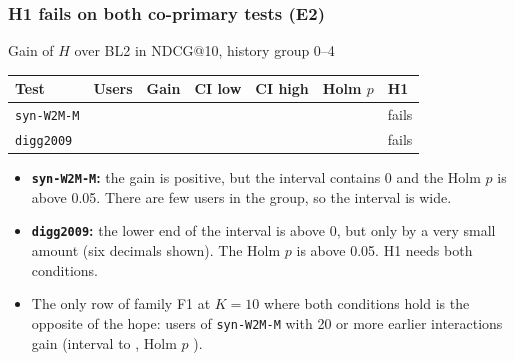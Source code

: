 \documentclass[aspectratio=169,11pt]{beamer}
\begin{document}
\begin{frame}
  \frametitle{H1 fails on both co-primary tests (E2)}
  \centering
  \small
  Gain of $H$ over BL2 in NDCG@10, history group 0--4\\[1.5mm]
  \footnotesize
  \begin{tabular}{lrrrrrl}
    \toprule
    Test & Users & Gain & CI low & CI high & Holm $p$ & H1 \\
    \midrule
    \texttt{syn-W2M-M} & \eTwoWTwoMNdcgTenZeroFourN{} & \eTwoWTwoMNdcgTenZeroFourGain{} & \eTwoWTwoMNdcgTenZeroFourCiLow{} & \eTwoWTwoMNdcgTenZeroFourCiHigh{} & \eTwoWTwoMNdcgTenZeroFourPHolm{} & fails \\
    \texttt{digg2009}  & \eTwoDiggNdcgTenZeroFourN{} & \eTwoDiggNdcgTenZeroFourGainFull{} & \eTwoDiggNdcgTenZeroFourCiLowFull{} & \eTwoDiggNdcgTenZeroFourCiHighFull{} & \eTwoDiggNdcgTenZeroFourPHolm{} & fails \\
    \bottomrule
  \end{tabular}
  \par\vspace{2mm}
  \raggedright\small
  \begin{itemize}
    \item \textbf{\texttt{syn-W2M-M}:} the gain is positive, but the interval contains 0 and the Holm $p$ is above 0.05. There are few users in the group, so the interval is wide.
    \item \textbf{\texttt{digg2009}:} the lower end of the interval is above 0, but only by a very small amount (six decimals shown). The Holm $p$ is above 0.05. H1 needs both conditions.
    \item The only row of family F1 at $K = 10$ where both conditions hold is the opposite of the hope: users of \texttt{syn-W2M-M} with 20 or more earlier interactions gain \eTwoWTwoMNdcgTenTwentyPlusGain{} (interval \eTwoWTwoMNdcgTenTwentyPlusCiLow{} to \eTwoWTwoMNdcgTenTwentyPlusCiHigh{}, Holm $p$ \eTwoWTwoMNdcgTenTwentyPlusPHolm{}).
  \end{itemize}
\end{frame}
\end{document}
